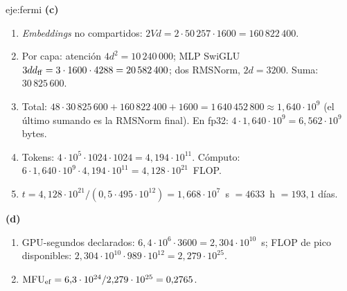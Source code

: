 \begin{solucion}{eje:fermi}
\noindent\textbf{(c)}
\begin{enumerate}[label=\arabic*.]
  \item \emph{Embeddings} no compartidos: $2Vd=2\cdot 50\,257\cdot 1600=160\,822\,400$.
  \item Por capa: atención $4d^{2}=10\,240\,000$; MLP SwiGLU $3dd_{\mathrm{ff}}=3\cdot 1600\cdot 4288=20\,582\,400$; dos RMSNorm, $2d=3200$. Suma: $30\,825\,600$.
  \item Total: $48\cdot 30\,825\,600+160\,822\,400+1600=1\,640\,452\,800\approx 1{,}640\cdot 10^{9}$ (el último sumando es la RMSNorm final). En fp32: $4\cdot 1{,}640\cdot 10^{9}=6{,}562\cdot 10^{9}$ bytes.
  \item Tokens: $4\cdot 10^{5}\cdot 1024\cdot 1024=4{,}194\cdot 10^{11}$. Cómputo: $6\cdot 1{,}640\cdot 10^{9}\cdot 4{,}194\cdot 10^{11}=4{,}128\cdot 10^{21}$~FLOP.
  \item $t=4{,}128\cdot 10^{21}/(0{,}5\cdot 495\cdot 10^{12})=1{,}668\cdot 10^{7}$~s $=4633$~h $=193{,}1$ días.
\end{enumerate}

\noindent\textbf{(d)}
\begin{enumerate}[label=\arabic*.]
  \item GPU-segundos declarados: $6{,}4\cdot 10^{6}\cdot 3600=2{,}304\cdot 10^{10}$~s; FLOP de pico disponibles: $2{,}304\cdot 10^{10}\cdot 989\cdot 10^{12}=2{,}279\cdot 10^{25}$.
  \item $\mathrm{MFU}_{\mathrm{ef}}=6{,}3\cdot 10^{24}/2{,}279\cdot 10^{25}=0{,}2765$.
\end{enumerate}


\end{solucion}
